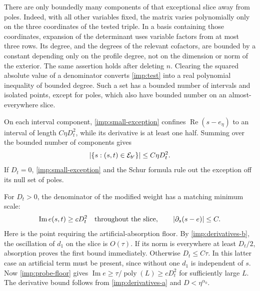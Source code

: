 There are only boundedly many components of that exceptional slice away
from poles. Indeed, with all other variables fixed, the matrix varies
polynomially only on the three coordinates of the tested triple.
In a basis containing those coordinates, expansion of the determinant
uses variable factors from at most three rows. Its degree, and the
degrees of the relevant cofactors, are bounded by a constant depending
only on the profile degree, not on the dimension or norm of the exterior.
The same assertion holds after deleting $n$. Clearing the squared
absolute value of a denominator converts \cref{imp:test} into a real
polynomial inequality of bounded degree. Such a set has a bounded
number of intervals and isolated points, except for poles, which also
have bounded number on an almost-everywhere slice.

On each interval component, \cref{imp:small-exception} confines
$\operatorname{Re}(s-e_\eta)$ to an interval of length
$C\eta D_t^2$, while its derivative is at least one half. Summing over
the bounded number of components gives
\begin{equation}
 \left\lvert\{s:(s,t)\in\mathcal E_{b'}\}\right\rvert
 \le C\eta D_t^2.
 \label{imp:slice-length}
\end{equation}
If $D_t=0$, \cref{imp:small-exception} and the Schur formula rule out
the exception off its null set of poles.

For $D_t>0$, the denominator of the modified weight has a matching
minimum scale:
\begin{equation}
 \operatorname{Im}e(s,t)\ge cD_t^2
 \quad\hbox{throughout the slice},
 \qquad
 \left\lvert\partial_s(s-e)\right\rvert\le C.
 \label{imp:linewidth}
\end{equation}
Here is the point requiring the artificial-absorption floor. By
\cref{imp:derivatives-b}, the oscillation of $d_1$ on the slice is
$O(\tau)$. If its norm is everywhere at least $D_t/2$, absorption proves
the first bound immediately. Otherwise $D_t\le C\tau$. In this latter
case an artificial term must be present, since without one $d_1$ is
independent of $s$. Now \cref{imp:probe-floor} gives
$\operatorname{Im}e\ge\tau/\operatorname{poly}(L)\ge cD_t^2$
for sufficiently large $L$. The derivative bound follows from
\cref{imp:derivatives-a} and $D<\eta^{\alpha_0}$.

